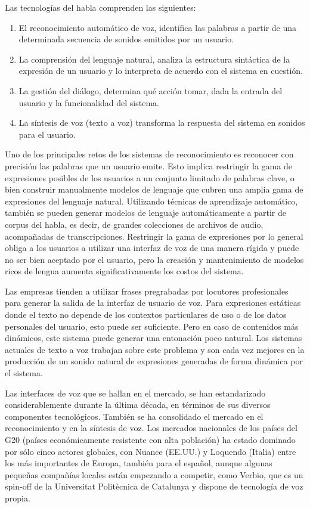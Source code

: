 \begin{multicols}{2}
Las tecnologías del habla comprenden las siguientes:

\begin{enumerate}
  \item El reconocimiento automático de voz, identifica las palabras a partir de una determinada secuencia de sonidos emitidos por un usuario.
  \item La comprensión del lenguaje natural, analiza la estructura sintáctica de la expresión de un usuario y lo interpreta de acuerdo con el sistema en cuestión.
  \item La gestión del diálogo, determina qué acción tomar, dada la entrada del usuario y la funcionalidad del sistema.
  \item La síntesis de voz (texto a voz) transforma la respuesta del sistema en sonidos para el usuario.
\end{enumerate}

Uno de los principales retos de los sistemas de reconocimiento es reconocer con precisión las palabras que un usuario emite. Esto implica restringir la gama de expresiones posibles de los usuarios a un conjunto limitado de palabras clave, o bien construir manualmente modelos de lenguaje que cubren una amplia gama de expresiones del lenguaje natural. Utilizando técnicas de aprendizaje automático, también se pueden generar modelos de lenguaje automáticamente a partir de corpus del habla, es decir,  de grandes colecciones de archivos de audio, acompañadas de transcripciones. Restringir la gama de expresiones por lo general obliga a los usuarios a utilizar una interfaz de voz de una manera rígida y puede no ser bien aceptado por el usuario, pero la creación y mantenimiento de modelos ricos de lengua aumenta significativamente los costos del sistema. 

Las empresas tienden a utilizar frases pregrabadas por locutores profesionales para generar la salida de la interfaz de usuario de voz. Para expresiones estáticas donde el texto no depende de los contextos particulares de uso o de los datos personales del usuario, esto puede ser suficiente. Pero en caso de contenidos más dinámicos, este sistema puede generar una entonación poco natural. Los sistemas actuales de texto a voz trabajan sobre este problema y son cada vez mejores en la producción de un sonido natural de expresiones generadas de forma dinámica por el sistema.


Las interfaces de voz que se hallan en el mercado, se han estandarizado considerablemente durante la última década, en términos de sus diversos componentes tecnológicos. También se ha consolidado el mercado en el reconocimiento y en la síntesis de voz. Los mercados nacionales de los países del G20 (países económicamente resistente con alta población) ha estado dominado por sólo cinco actores globales, con Nuance (EE.UU.) y Loquendo (Italia) entre los más importantes de Europa, también para el español, aunque algunas pequeñas compañías locales están empezando a competir, como Verbio, que es un spin-off de la Universitat Politècnica de Catalunya y dispone de tecnología de voz propia.


\end{multicols}
